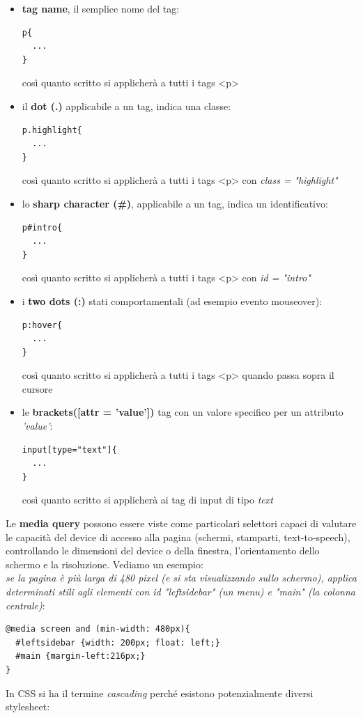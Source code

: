 \documentclass[a4paper,12pt, oneside]{book}
\begin{document}
\begin{itemize}
	\item \textbf{tag name}, il semplice nome del tag:
	      \begin{verbatim}
p{
  ...
}
\end{verbatim}
	      così quanto scritto si applicherà a tutti i tags <p>
	\item il \textbf{dot (.)} applicabile a un tag, indica una classe:
	      \begin{verbatim}
p.highlight{
  ...
}
\end{verbatim}
	      così quanto scritto si applicherà a tutti i tags <p> con \textit{class =} \textit{"highlight"}
	\item lo \textbf{sharp character (\#)}, applicabile a un tag, indica un identificativo:
	      \begin{verbatim}
p#intro{
  ...
}
\end{verbatim}
	      così quanto scritto si applicherà a tutti i tags <p> con \textit{id = "intro"}
	\item i \textbf{two dots (:)} stati comportamentali (ad esempio evento mouseover):
	      \begin{verbatim}
p:hover{
  ...
}
\end{verbatim}
	      così quanto scritto si applicherà a tutti i tags <p> quando passa sopra il cursore
	\item le \textbf{brackets([attr = 'value'])} tag con un valore specifico per un attributo \textit{'value'}:
	      \begin{verbatim}
input[type="text"]{
  ...
}
\end{verbatim}
	      così quanto scritto si applicherà ai tag di input di tipo \textit{text}
\end{itemize}
Le \textbf{media query} possono essere viste come particolari selettori capaci di valutare le capacità del device di accesso alla pagina (schermi, stamparti, text-to-speech), controllando le dimensioni del device o della finestra, l'orientamento dello schermo e la risoluzione. Vediamo un esempio:\\
\textit{se la pagina è più larga di 480
	pixel (e si sta visualizzando sullo schermo), applica
	determinati stili agli elementi con id "leftsidebar" (un menu) e "main" (la colonna centrale)}:
\begin{verbatim}
@media screen and (min-width: 480px){
  #leftsidebar {width: 200px; float: left;}
  #main {margin-left:216px;}
}
\end{verbatim}
In CSS si ha il termine \textit{cascading} perché esistono potenzialmente diversi stylesheet:
\end{document}
